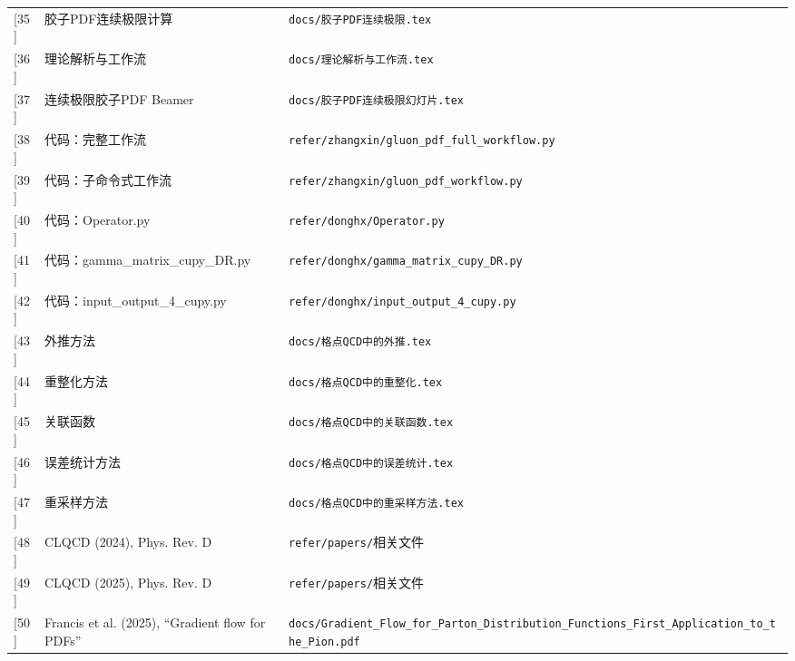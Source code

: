\documentclass[12pt,a4paper]{ctexart}
\theoremstyle{definition}
\begin{document}
\begin{longtable}{lp{6cm}p{5cm}}
[35] & 胶子PDF连续极限计算 & \texttt{docs/胶子PDF连续极限.tex} \\

[36] & 理论解析与工作流 & \texttt{docs/理论解析与工作流.tex} \\

[37] & 连续极限胶子PDF Beamer & \texttt{docs/胶子PDF连续极限幻灯片.tex} \\

[38] & 代码：完整工作流 & \texttt{refer/zhangxin/gluon\_pdf\_full\_workflow.py} \\

[39] & 代码：子命令式工作流 & \texttt{refer/zhangxin/gluon\_pdf\_workflow.py} \\

[40] & 代码：Operator.py & \texttt{refer/donghx/Operator.py} \\

[41] & 代码：gamma\_matrix\_cupy\_DR.py & \texttt{refer/donghx/gamma\_matrix\_cupy\_DR.py} \\

[42] & 代码：input\_output\_4\_cupy.py & \texttt{refer/donghx/input\_output\_4\_cupy.py} \\

[43] & 外推方法 & \texttt{docs/格点QCD中的外推.tex} \\

[44] & 重整化方法 & \texttt{docs/格点QCD中的重整化.tex} \\

[45] & 关联函数 & \texttt{docs/格点QCD中的关联函数.tex} \\

[46] & 误差统计方法 & \texttt{docs/格点QCD中的误差统计.tex} \\

[47] & 重采样方法 & \texttt{docs/格点QCD中的重采样方法.tex} \\

[48] & CLQCD (2024), Phys. Rev. D & \texttt{refer/papers/}相关文件 \\

[49] & CLQCD (2025), Phys. Rev. D & \texttt{refer/papers/}相关文件 \\

[50] & Francis et al. (2025), ``Gradient flow for PDFs'' & \texttt{docs/Gradient\_Flow\_for\_Parton\_Distribution\_Functions\_First\_Application\_to\_the\_Pion.pdf} \\
\end{longtable}

\end{document}
